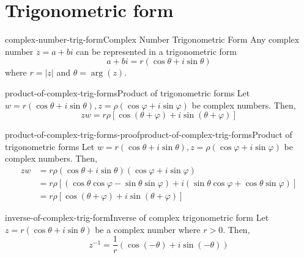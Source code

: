 \documentclass[preview]{standalone}
\begin{document}
\genpage

\section{Trigonometric form}

\begin{snippettheorem}{complex-number-trig-form}{Complex Number Trigonometric Form}
    Any complex number \(z=a+bi\) can be represented in a trigonometric form
    \[
        a+bi=r(\cos\theta+i\sin\theta)
    \]
    where \(r=|z|\) and \(\theta = \arg(z)\).
\end{snippettheorem}

\begin{snippetproposition}{product-of-complex-trig-forms}{Product of trigonometric forms}
    Let \(w = r(\cos\theta + i\sin\theta), z = \rho(\cos\varphi + i\sin\varphi)\) be complex numbers. Then,
    \[
        zw = r\rho \left[ \cos(\theta + \varphi) + i\sin(\theta + \varphi) \right]
    \]
\end{snippetproposition}

\begin{snippetproof}{product-of-complex-trig-forms-proof}{product-of-complex-trig-forms}{Product of trigonometric forms}
    Let \(w = r(\cos\theta + i\sin\theta), z = \rho(\cos\varphi + i\sin\varphi)\) be complex numbers. Then,
    \begin{align*}
        zw &= r\rho (\cos\theta + i\sin\theta)(\cos\varphi + i\sin\varphi) \\
        &= r\rho \left[ (\cos\theta\cos\varphi - \sin\theta\sin\varphi) + i(\sin\theta\cos\varphi + \cos\theta\sin\varphi) \right] \\
        &= r\rho \left[ \cos(\theta + \varphi) + i\sin(\theta + \varphi) \right]
    \end{align*}
\end{snippetproof}

\begin{snippetproposition}{inverse-of-complex-trig-form}{Inverse of complex trigonometric form}
    Let \(z = r(\cos\theta + i\sin\theta)\) be a complex number where \(r>0\). Then,
    \[
        z^{-1} = \frac{1}{r}(\cos(-\theta) + i\sin(-\theta))
    \]
\end{snippetproposition}
\end{document}
